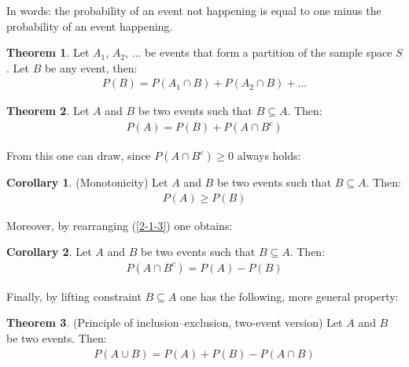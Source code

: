 \documentclass[
  oneside,
  11pt, a4paper,
  footinclude=true,
  headinclude=true,
  cleardoublepage=empty
]{scrbook}
\theoremstyle{definition}
\theoremstyle{definition}
\newtheorem{theorem}{Theorem}[section]
\newtheorem{corollary}{Corollary}[theorem]
\begin{document}
            \noindent In words: the probability of an event not happening is equal to one minus the probability of an event happening.
            
            
            \begin{theorem}{Let $A_1$, $A_2$, ... be events that form a partition of the sample space $S$. Let $B$ be any event, then:}
                \begin{align*}
                    P(B) = P(A_1 \cap B) + P(A_2 \cap B) + ...
                \end{align*}{}
            \end{theorem}
            
            \begin{theorem}{Let $A$ and $B$ be two events such that $B \subseteq A$. Then:}
                \begin{align}\label{2-1-3}
                    P(A) = P(B) + P(A \cap B^c)
                \end{align}{}
            \end{theorem}
            
            \noindent From this one can draw, since  $P(A \cap B^c) \geq 0$ always holds:

            \begin{corollary}{(Monotonicity) Let $A$ and $B$ be two events such that $B \subseteq A$. Then:}
                \begin{align*}
                    P(A) \geq P(B)
                \end{align*}{}
            \end{corollary}
            
            \noindent Moreover, by rearranging (\ref{2-1-3}) one obtains:
            \begin{corollary}{Let $A$ and $B$ be two events such that $B \subseteq A$. Then:}
                \begin{align*}
                    P(A \cap B^c) = P(A) - P(B)
                \end{align*}{}
            \end{corollary}
            
            \noindent Finally, by lifting constraint $B \subseteq A$ one has the following, more general property:
            \begin{theorem}{(Principle of inclusion–exclusion, two-event version) Let $A$ and $B$ be two events. Then:}
                \begin{align}\label{t-2-1-4}
                    P(A \cup B) = P(A) + P(B) - P(A \cap B)
                \end{align}{}
            \end{theorem}
            
\end{document}
